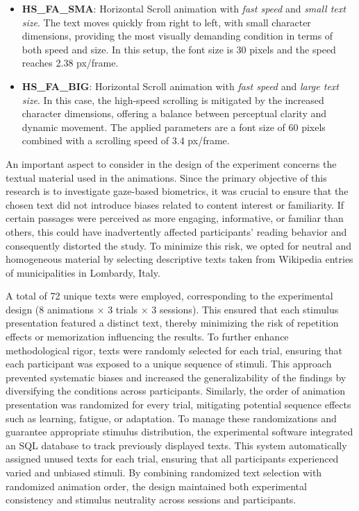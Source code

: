 \documentclass[12pt]{report}
\begin{document}
\begin{itemize}
    \item \textbf{HS\_FA\_SMA}: Horizontal Scroll animation with \emph{fast speed} and \emph{small text size}. 
    The text moves quickly from right to left, with small character dimensions, providing the most visually demanding condition in terms of both speed and size. 
    In this setup, the font size is 30 pixels and the speed reaches 2.38 px/frame. 

    \item \textbf{HS\_FA\_BIG}: Horizontal Scroll animation with \emph{fast speed} and \emph{large text size}. 
    In this case, the high-speed scrolling is mitigated by the increased character dimensions, offering a balance between perceptual clarity and dynamic movement.  
    The applied parameters are a font size of 60 pixels combined with a scrolling speed of 3.4 px/frame.
\end{itemize}

An important aspect to consider in the design of the experiment concerns the textual material used in the animations. 
Since the primary objective of this research is to investigate gaze-based biometrics, it was crucial to ensure that the chosen text did not introduce biases related to content interest or familiarity. 
If certain passages were perceived as more engaging, informative, or familiar than others, this could have inadvertently affected participants' reading behavior and consequently distorted the study. 
To minimize this risk, we opted for neutral and homogeneous material by selecting descriptive texts taken from Wikipedia entries of municipalities in Lombardy, Italy.

A total of 72 unique texts were employed, corresponding to the experimental design (8 animations × 3 trials × 3 sessions). 
This ensured that each stimulus presentation featured a distinct text, thereby minimizing the risk of repetition effects or memorization influencing the results.
To further enhance methodological rigor, texts were randomly selected for each trial, ensuring that each participant was exposed to a unique sequence of stimuli. 
This approach prevented systematic biases and increased the generalizability of the findings by diversifying the conditions across participants.
Similarly, the order of animation presentation was randomized for every trial, mitigating potential sequence effects such as learning, fatigue, or adaptation.
To manage these randomizations and guarantee appropriate stimulus distribution, the experimental software integrated an SQL database to track previously displayed texts. 
This system automatically assigned unused texts for each trial, ensuring that all participants experienced varied and unbiased stimuli. 
By combining randomized text selection with randomized animation order, the design maintained both experimental consistency and stimulus neutrality across sessions and participants.
\end{document}
